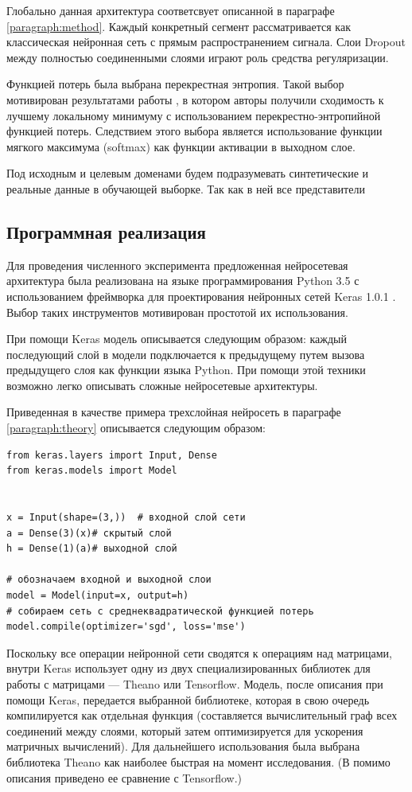 \documentclass[14pt, a4paper]{extarticle}
\begin{document}
Глобально данная архитектура соответсвует описанной в параграфе \ref{paragraph:method}. Каждый конкретный сегмент рассматривается как классическая нейронная сеть с прямым распространением сигнала. Слои Dropout между полностью соединенными слоями играют роль средства регуляризации.

Функцией потерь была выбрана перекрестная энтропия. Такой выбор мотивирован результатами работы \cite{crossentropy_vs_mse}, в котором авторы получили сходимость к лучшему локальному минимуму с использованием перекрестно-энтропийной функцией потерь. Следствием этого выбора является использование функции мягкого максимума (softmax) как функции активации в выходном слое.

Под исходным и целевым доменами будем подразумевать синтетические и реальные данные в обучающей выборке. Так как в ней все представители 

\subsection*{Программная реализация}

Для проведения численного эксперимента предложенная нейросетевая архитектура была реализована на языке программирования Python 3.5 с использованием фреймворка для проектирования нейронных сетей Keras 1.0.1 \cite{keras}. Выбор таких инструментов мотивирован простотой их использования.

При помощи Keras модель описывается следующим образом: каждый последующий слой в модели подключается к предыдущему путем вызова предыдущего слоя как функции языка Python. При помощи этой техники возможно легко описывать сложные нейросетевые архитектуры.

Приведенная в качестве примера трехслойная нейросеть в параграфе \ref{paragraph:theory} описывается следующим образом:
\begin{verbatim}
from keras.layers import Input, Dense
from keras.models import Model


x = Input(shape=(3,))  # входной слой сети
a = Dense(3)(x)# скрытый слой
h = Dense(1)(a)# выходной слой

# обозначаем входной и выходной слои
model = Model(input=x, output=h)
# собираем сеть с среднеквадратической функцией потерь
model.compile(optimizer='sgd', loss='mse')
\end{verbatim}

Поскольку все операции нейронной сети сводятся к операциям над матрицами, внутри Keras использует одну из двух специализированных библиотек для работы с матрицами — Theano или Tensorflow. Модель, после описания при помощи Keras, передается выбранной библиотеке, которая в свою очередь компилируется как отдельная функция (составляется вычислительный граф всех соединений между слоями, который затем оптимизируется для ускорения матричных вычислений). Для дальнейшего использования была выбрана библиотека Theano \cite{theano} как наиболее быстрая на момент исследования. (В \cite{theano} помимо описания приведено ее сравнение с Tensorflow.)
\end{document}
